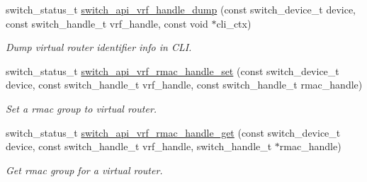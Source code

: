 \begin{DoxyCompactItemize}
switch\+\_\+status\+\_\+t \hyperlink{group__VRF_ga35b76770bf867548181e88dd432cfcec}{switch\+\_\+api\+\_\+vrf\+\_\+handle\+\_\+dump} (const switch\+\_\+device\+\_\+t device, const switch\+\_\+handle\+\_\+t vrf\+\_\+handle, const void $\ast$cli\+\_\+ctx)
\begin{DoxyCompactList}\small\item\em Dump virtual router identifier info in C\+L\+I. \end{DoxyCompactList}\item 
switch\+\_\+status\+\_\+t \hyperlink{group__VRF_ga17a587af1024a7b6a8055da8f3e86880}{switch\+\_\+api\+\_\+vrf\+\_\+rmac\+\_\+handle\+\_\+set} (const switch\+\_\+device\+\_\+t device, const switch\+\_\+handle\+\_\+t vrf\+\_\+handle, const switch\+\_\+handle\+\_\+t rmac\+\_\+handle)
\begin{DoxyCompactList}\small\item\em Set a rmac group to virtual router. \end{DoxyCompactList}\item 
switch\+\_\+status\+\_\+t \hyperlink{group__VRF_ga31b7064921d28ed1a85e9f3c7a0ec8d3}{switch\+\_\+api\+\_\+vrf\+\_\+rmac\+\_\+handle\+\_\+get} (const switch\+\_\+device\+\_\+t device, const switch\+\_\+handle\+\_\+t vrf\+\_\+handle, switch\+\_\+handle\+\_\+t $\ast$rmac\+\_\+handle)
\begin{DoxyCompactList}\small\item\em Get rmac group for a virtual router. \end{DoxyCompactList}\end{DoxyCompactItemize}


